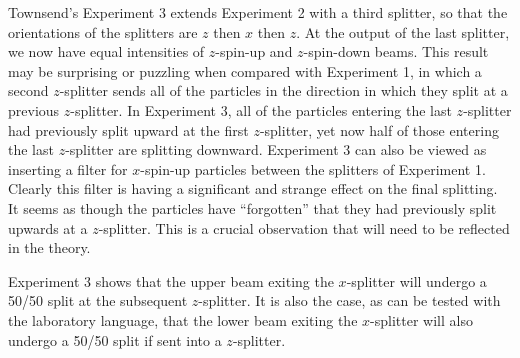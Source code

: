 \documentclass[12pt]{article}
\begin{document}
Townsend's Experiment 3 extends Experiment 2 with a third
splitter, so that the orientations of the splitters are $z$
then $x$ then $z$.  At the output of the last splitter,
we now have equal intensities of $z$-spin-up and $z$-spin-down
beams.
This result may be surprising or puzzling
when compared with Experiment 1, in which a second $z$-splitter
sends all of the particles in the direction in which they
split at a previous $z$-splitter.
In Experiment 3, all of the particles entering the last $z$-splitter
had previously split upward at the first $z$-splitter, yet now half
of those entering the last $z$-splitter are splitting downward.
Experiment 3 can also be viewed as inserting a filter for $x$-spin-up
particles between the splitters of Experiment 1.
Clearly this filter is having a significant and strange effect
on the final splitting.  It seems as though the particles have
``forgotten'' that they had previously split upwards at a $z$-splitter.
This is a crucial observation that will need to be reflected in the
theory.

Experiment 3 shows that the upper beam exiting the $x$-splitter
will undergo a 50/50 split at the subsequent $z$-splitter.
It is also the case, as can be tested with the laboratory language,
that the lower beam exiting the $x$-splitter
will also undergo a 50/50 split if sent into a $z$-splitter.
\end{document}
